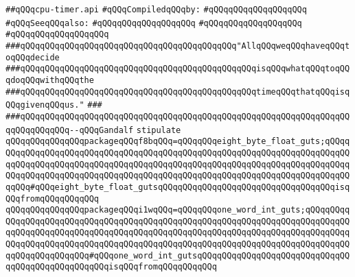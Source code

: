 \label{src/lib/std/src/cpu-timer.api}
\verb|##qQQqcpu-timer.api|\newline
\newline
\verb|#qQQqCompiledqQQqby:|\newline
\verb|#qQQqqQQqqQQqqQQqqQQq|\newline
\newline
\verb|#qQQqSeeqQQqalso:|\newline
\verb|#qQQqqQQqqQQqqQQqqQQq|\newline
\verb|#qQQqqQQqqQQqqQQqqQQq|\newline
\verb|#qQQqqQQqqQQqqQQqqQQq|\newline
\newline
\newline
\verb|###qQQqqQQqqQQqqQQqqQQqqQQqqQQqqQQqqQQqqQQqqQQq"AllqQQqweqQQqhaveqQQqtoqQQqdecide|\newline
\verb|###qQQqqQQqqQQqqQQqqQQqqQQqqQQqqQQqqQQqqQQqqQQqqQQqisqQQqwhatqQQqtoqQQqdoqQQqwithqQQqthe|\newline
\verb|###qQQqqQQqqQQqqQQqqQQqqQQqqQQqqQQqqQQqqQQqqQQqqQQqtimeqQQqthatqQQqisqQQqgivenqQQqus."|\newline
\verb|###|\newline
\verb|###qQQqqQQqqQQqqQQqqQQqqQQqqQQqqQQqqQQqqQQqqQQqqQQqqQQqqQQqqQQqqQQqqQQqqQQqqQQqqQQq--qQQqGandalf|\newline
\newline
\newline
\newline
\verb|stipulate|\newline
\verb|qQQqqQQqqQQqqQQqpackageqQQqf8bqQQq=qQQqqQQqeight_byte_float_guts;qQQqqQQqqQQqqQQqqQQqqQQqqQQqqQQqqQQqqQQqqQQqqQQqqQQqqQQqqQQqqQQqqQQqqQQqqQQqqQQqqQQqqQQqqQQqqQQqqQQqqQQqqQQqqQQqqQQqqQQqqQQqqQQqqQQqqQQqqQQqqQQqqQQqqQQqqQQqqQQqqQQqqQQqqQQqqQQqqQQqqQQqqQQqqQQqqQQqqQQqqQQqqQQqqQQqqQQqqQQq#qQQqeight_byte_float_gutsqQQqqQQqqQQqqQQqqQQqqQQqqQQqqQQqqQQqisqQQqfromqQQqqQQqqQQq|\newline
\verb|qQQqqQQqqQQqqQQqpackageqQQqi1wqQQq=qQQqqQQqone_word_int_guts;qQQqqQQqqQQqqQQqqQQqqQQqqQQqqQQqqQQqqQQqqQQqqQQqqQQqqQQqqQQqqQQqqQQqqQQqqQQqqQQqqQQqqQQqqQQqqQQqqQQqqQQqqQQqqQQqqQQqqQQqqQQqqQQqqQQqqQQqqQQqqQQqqQQqqQQqqQQqqQQqqQQqqQQqqQQqqQQqqQQqqQQqqQQqqQQqqQQqqQQqqQQqqQQqqQQqqQQqqQQqqQQqqQQqqQQqqQQq#qQQqone_word_int_gutsqQQqqQQqqQQqqQQqqQQqqQQqqQQqqQQqqQQqqQQqqQQqqQQqqQQqisqQQqfromqQQqqQQqqQQq|\newline
